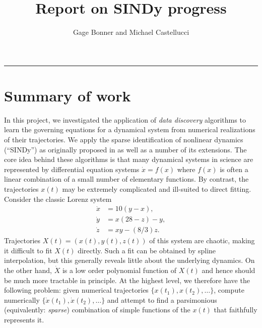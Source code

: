 \documentclass[
]{article}
\title{Report on SINDy progress}
\author{Gage Bonner and Michael Castellucci}
\date{}
\renewcommand*\contentsname{Table of contents}
\newcommand\contentsname{Table of contents}
\begin{document}
\maketitle

\renewcommand*\contentsname{Table of contents}
{
\hypersetup{linkcolor=}
\setcounter{tocdepth}{3}
\tableofcontents
}
\begin{center}\rule{0.5\linewidth}{0.5pt}\end{center}

\section{Summary of work}\label{summary-of-work}

In this project, we investigated the application of \emph{data
discovery} algorithms to learn the governing equations for a dynamical
system from numerical realizations of their trajectories. We apply the
sparse identification of nonlinear dynamics (``SINDy'') as originally
proposed in \cite{brunton2016discovering} as well as a number of its
extensions. The core idea behind these algorithms is that many dynamical
systems in science are represented by differential equation systems
\(\dot{x} = f(x)\) where \(f(x)\) is often a linear combination of a
small number of elementary functions. By contrast, the trajectories
\(x(t)\) may be extremely complicated and ill-suited to direct fitting.
Consider the classic Lorenz system
\begin{subequations} \label{eq:lorenz-def}
\begin{align} 
    \dot{x} &= 10 (y - x), \\
    \dot{y} &= x (28 - z) - y, \\ 
    \dot{z} &= x y - (8 / 3) z .
\end{align}
\end{subequations} Trajectories \(X(t) = (x(t), y(t), z(t))\) of this
system are chaotic, making it difficult to fit \(X(t)\) directly. Such a
fit can be obtained by spline interpolation, but this generally reveals
little about the underlying dynamics. On the other hand, \(\dot{X}\) is
a low order polynomial function of \(X(t)\) and hence should be much
more tractable in principle. At the highest level, we therefore have the
following problem: given numerical trajectories
\(\{x(t_1), x(t_2), \dots \}\), compute numerically
\(\{\dot{x}(t_1), \dot{x}(t_2), \dots \}\) and attempt to find a
parsimonious (equivalently: \emph{sparse}) combination of simple
functions of the \(x(t)\) that faithfully represents it.
\end{document}
